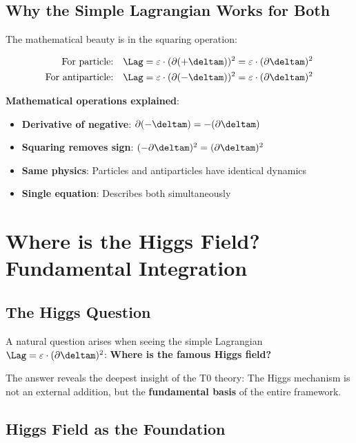 	\subsection{Why the Simple Lagrangian Works for Both}
	
	The mathematical beauty is in the squaring operation:
	
	\begin{align}
		\text{For particle:} \quad \Lag &= \varepsilon \cdot (\partial (+\deltam))^2 = \varepsilon \cdot (\partial \deltam)^2 \\
		\text{For antiparticle:} \quad \Lag &= \varepsilon \cdot (\partial (-\deltam))^2 = \varepsilon \cdot (\partial \deltam)^2
	\end{align}
	
	\textbf{Mathematical operations explained}:
	\begin{itemize}
		\item \textbf{Derivative of negative}: $\partial(-\deltam) = -(\partial\deltam)$
		\item \textbf{Squaring removes sign}: $(-\partial\deltam)^2 = (\partial\deltam)^2$
		\item \textbf{Same physics}: Particles and antiparticles have identical dynamics
		\item \textbf{Single equation}: Describes both simultaneously
	\end{itemize}
	
	\section{Where is the Higgs Field? Fundamental Integration}
	
	\subsection{The Higgs Question}
	
	A natural question arises when seeing the simple Lagrangian $\Lag = \varepsilon \cdot (\partial \deltam)^2$: \textbf{Where is the famous Higgs field?}
	
	The answer reveals the deepest insight of the T0 theory: The Higgs mechanism is not an external addition, but the \textbf{fundamental basis} of the entire framework.
	
	\subsection{Higgs Field as the Foundation}
	
